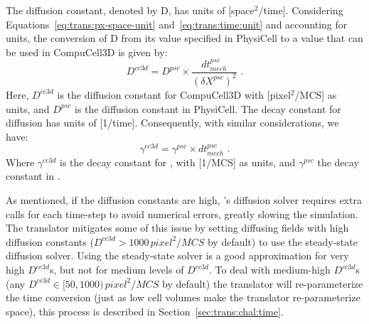 The diffusion constant, denoted by D, has units of [space$^2$/time]. Considering Equations~\ref{eq:trans:px-space-unit} and~\ref{eq:trans:time:unit} and accounting for units, the conversion of D from its value specified in PhysiCell to a value that can be used in CompuCell3D is given by:
\begin{equation}\label{eq:trans:diff-const}
    D^{cc3d} = D^{psc} \times \frac{dt^{psc}_{mech}}{(\delta X^{psc})^2}\,\,.
\end{equation}
\noindent Here, $D^{cc3d}$ is the diffusion constant for CompuCell3D with [pixel$^2$/MCS] as units, and $D^{psc}$ is the diffusion constant in PhysiCell. The decay constant for diffusion has units of [1/time]. Consequently, with similar considerations, we have:
\begin{equation}\label{eq:trans:decay-const}
    \gamma^{cc3d} = \gamma^{psc} \times dt^{psc}_{mech}\,\,.
\end{equation}
\noindent Where $\gamma^{cc3d}$ is the decay constant for \ccd, with [1/MCS] as units, and $\gamma^{psc}$ the decay constant in \psc.

As mentioned, if the diffusion constants are high, \ccd's diffusion solver requires extra calls for each time-step to avoid numerical errors, greatly slowing the simulation. The translator mitigates some of this issue by setting diffusing fields with high diffusion constants ($D^{cc3d}>1000\,pixel^2/MCS$ by default) to use the steady-state diffusion solver. Using the steady-state solver is a good approximation for very high $D^{cc3d}$s, but not for medium levels of $D^{cc3d}$. To deal with medium-high $D^{cc3d}$s (any $ D^{cc3d} \in [50, 1000) \,pixel^2/MCS$ by default)  the translator will re-parameterize the time conversion (just as low cell volumes make the translator re-parameterize space), this process is described in Section~\ref{sec:trans:chal:time}. 


